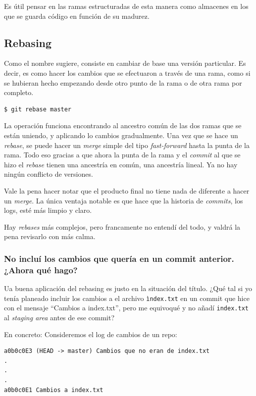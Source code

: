 \documentclass[spanish, 12pt, a4paper]{article}
\begin{document}
Es útil pensar en las ramas estructuradas de esta manera como almacenes en los que se guarda código en función de su madurez.


\subsection{Rebasing}
Como el nombre sugiere, consiste en cambiar de base una versión particular.
Es decir, es como hacer los cambios que se efectuaron a través de una rama, como si se hubieran hecho empezando desde otro punto de la rama o de otra rama por completo.
\begin{lstlisting}
$ git rebase master
\end{lstlisting}

La operación funciona encontrando al ancestro común de las dos ramas que se están uniendo, y aplicando lo cambios gradualmente.
Una vez que se hace un \textit{rebase}, se puede hacer un \textit{merge} simple del tipo \textit{fast-forward} hasta la punta de la rama.
Todo eso gracias a que ahora la punta de la rama y el \textit{commit} al que se hizo el \textit{rebase} tienen una ancestría en común, una ancestría lineal.
Ya no hay ningún conflicto de versiones.

Vale la pena hacer notar que el producto final no tiene nada de diferente a hacer un \textit{merge}.
La única ventaja notable es que hace que la historia de \textit{commits}, los logs, esté más limpio y claro.

Hay \textit{rebases} más complejos, pero francamente no entendí del todo, y valdrá la pena revisarlo con más calma.

\subsubsection{No incluí los cambios que quería en un commit anterior. ¿Ahora qué hago?}
Ua buena aplicación del rebasing es justo en la situación del título. ¿Qué tal si yo tenía planeado incluir los cambios a el archivo \texttt{ìndex.txt} en un commit que hice con el mensaje ``Cambios a index.txt'', pero me equivoqué y no añadí \texttt{index.txt} al \textit{staging area} antes de ese commit?

En concreto: Consideremos el log de cambios de un repo:
\begin{lstlisting}
a0b0c0E3 (HEAD -> master) Cambios que no eran de index.txt
.
.
.
a0b0c0E1 Cambios a index.txt
\end{lstlisting}
\end{document}
